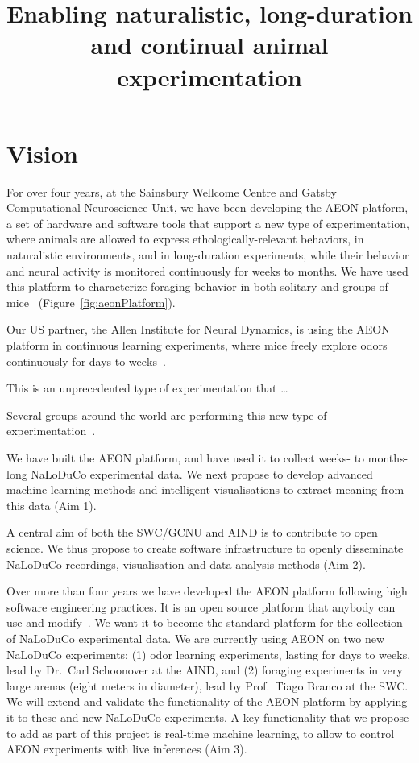 \documentclass[12pt]{article}
\title{Enabling naturalistic, long-duration and continual animal experimentation}
\begin{document}
\maketitle

\tableofcontents
\pagebreak

\section{Vision}

For over four years, at the Sainsbury Wellcome Centre and Gatsby Computational
Neuroscience Unit, we have been developing the AEON platform, a set of hardware
and software tools that support a new type of experimentation, where animals
are allowed to express ethologically-relevant behaviors, in naturalistic
environments, and in long-duration experiments, while their behavior and
neural activity is monitored continuously for weeks to months.
%
We have used this platform to characterize foraging behavior in both solitary
and groups of mice~\citep{aeonRepo} (Figure~\ref{fig:aeonPlatform}).

Our US partner, the Allen Institute for Neural Dynamics, is using the AEON
platform in continuous learning experiments, where mice freely explore odors
continuously for days to weeks~\citep{carlsPapers}.

This is an unprecedented type of experimentation that \ldots

Several groups around the world are performing this new type of
experimentation~\cite{}.

We have built the AEON platform, and have used it to collect weeks- to
months-long NaLoDuCo experimental data. We next propose to develop advanced
machine learning methods and intelligent visualisations to extract meaning from
this data (Aim 1).

A central aim of both the SWC/GCNU and AIND is to contribute to open science.
We thus propose to create software infrastructure to openly disseminate
NaLoDuCo recordings, visualisation and data analysis methods (Aim 2).

Over more than four years we have developed the AEON platform following high
software engineering practices. It is an open source platform that anybody can
use and modify~\citep{aeonResources}. We want it to become the standard platform for the collection
of NaLoDuCo experimental data.
%
We are currently using AEON on two new NaLoDuCo experiments: (1) odor learning
experiments, lasting for days to weeks, lead by Dr.~Carl Schoonover at the
AIND, and (2) foraging experiments in very large arenas (eight meters in
diameter), lead by Prof.~Tiago Branco at the SWC.
%
We will extend and validate the functionality of the AEON platform by applying
it to these and new NaLoDuCo experiments.
%
A key functionality that we propose to add as part of this project is real-time
machine learning, to allow to control AEON experiments with live inferences
(Aim 3).
\end{document}
